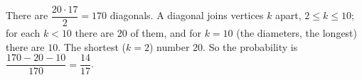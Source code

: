 There are $\dfrac{20\cdot17}2=170$ diagonals. A diagonal joins vertices $k$ apart, $2\le k\le10$; for each $k<10$ there are $20$ of them, and for $k=10$ (the diameters, the longest) there are $10$. The shortest ($k=2$) number $20$. So the probability is $\dfrac{170-20-10}{170}=\boxed{\dfrac{14}{17}}$.
